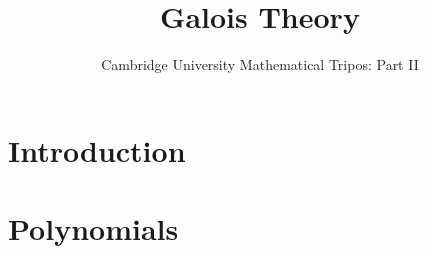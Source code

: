 \documentclass{article}
\title{Galois Theory}
\author{Cambridge University Mathematical Tripos: Part II}
\begin{document}
\maketitle

\tableofcontentsnewpage{}

\section{Introduction}

\section{Polynomials}

\end{document}
